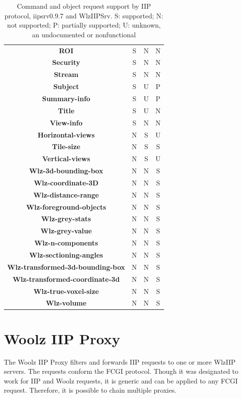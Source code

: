 \documentclass[11pt]{article}
\newcommand{\com}[1]{\textbf{#1}}
\begin{document}
\begin{table}[!hp]
{\begin{tabular}{|c|c|c|c|}
\com{ROI}               & S & N & N \\
\com{Security}          & S & N & N \\
\com{Stream}            & S & N & N \\
\com{Subject}           & S & U & P \\
\com{Summary-info}      & S & U & P \\
\com{Title}             & S & U & N \\
\com{View-info}         & S & N & N \\
\hline
\com{Horizontal-views}      & N & S & U \\
\com{Tile-size}             & N & S & S \\
\com{Vertical-views}        & N & S & U \\
\hline
\com{Wlz-3d-bounding-box}   & N & N & S \\
\com{Wlz-coordinate-3D}     & N & N & S \\
\com{Wlz-distance-range}    & N & N & S \\
\com{Wlz-foreground-objects}& N & N & S \\
\com{Wlz-grey-stats}        & N & N & S \\
\com{Wlz-grey-value}        & N & N & S \\
\com{Wlz-n-components}      & N & N & S \\
\com{Wlz-sectioning-angles} & N & N & S \\
\com{Wlz-transformed-3d-bounding-box}   & N & N & S \\
\com{Wlz-transformed-coordinate-3d}        & N & N & S \\
\com{Wlz-true-voxel-size}   & N & N & S \\
\com{Wlz-volume}            & N & N & S \\
\hline
\end{tabular}
}
\caption{Command and object request support by IIP protocol,
         iipsrv0.9.7 and WlzIIPSrv. S: supported; N: not supported;
	 P: partially supported; U: unknown, an undocumented or
	 nonfunctional}
\label{tab:comparision}
\end{table}

\section{Woolz IIP Proxy}

The Woolz IIP Proxy filters and forwards IIP requests to one or more
WlzIIP servers. The requests conform the FCGI protocol. Though it was
designated to work for IIP and Woolz requests, it is generic and can
be applied to any FCGI request. Therefore, it is possible to chain
multiple proxies.
\end{document}
